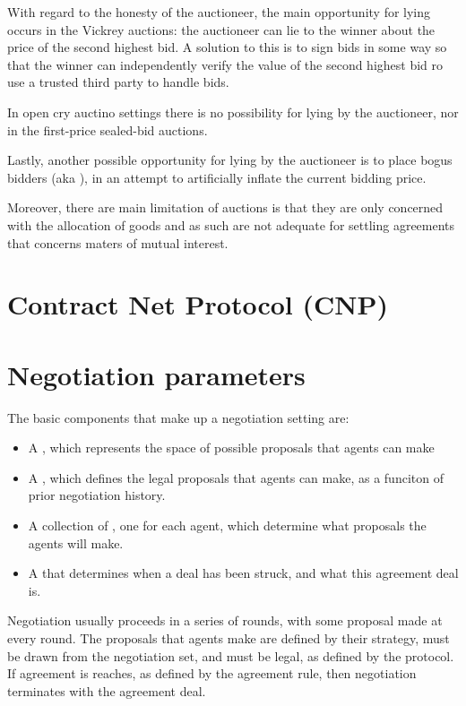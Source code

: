 With regard to the honesty of the auctioneer, the main opportunity for lying occurs in the Vickrey auctions: the auctioneer can lie to the winner about the price of the second highest bid. A solution to this is to sign bids in some way so that the winner can independently verify the value of the second highest bid ro use a trusted third party to handle bids.

In open cry auctino settings there is no possibility for lying by the auctioneer, nor in  the first-price sealed-bid auctions.

Lastly, another possible opportunity for lying by the auctioneer is to place bogus bidders (aka ), in an attempt to artificially inflate the current bidding price.

Moreover, there are main limitation of auctions is that they are only concerned with the allocation of goods and as such are not adequate for settling agreements that concerns maters of mutual interest.

\section{Contract Net Protocol (CNP)}

\section{Negotiation parameters}
The basic components that make up a negotiation setting are:
\begin{itemize}
\item A , which represents the space of possible proposals that agents can make
\item A , which defines the legal proposals that agents can make, as a funciton of prior negotiation history.
\item A collection of , one for each agent, which determine what proposals the agents will make.
\item A  that determines when a deal has been struck, and what this agreement deal is.
\end{itemize}

Negotiation usually proceeds in a series of rounds, with some proposal made at every round. The proposals that agents make are defined by their strategy, must be drawn from the negotiation set, and must be legal, as defined by the protocol.\\
If agreement is reaches, as defined by the agreement rule, then negotiation terminates with the agreement deal.\\

